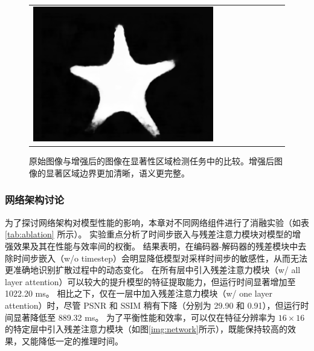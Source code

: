 \begin{figure}[ht]
\begin{center}
\begin{tabular}{ccccccccc}
            \includegraphics[width = 0.10\linewidth, height=0.10\linewidth]{figures/ch3/compare/discussion/SOD/sod/9.png}  \\
		\end{tabular}
	\end{center}
	\caption{\label{img:sod}原始图像与增强后的图像在显著性区域检测任务中的比较。增强后图像的显著区域边界更加清晰，语义更完整。}
	\vspace{-2mm}
\end{figure}     %

\subsubsection{网络架构讨论}
为了探讨网络架构对模型性能的影响，本章对不同网络组件进行了消融实验（如表 \ref{tab:ablation} 所示）。
实验重点分析了时间步嵌入与残差注意力模块对模型的增强效果及其在性能与效率间的权衡。
结果表明，在编码器-解码器的残差模块中去除时间步嵌入（w/o timestep）会明显降低模型对采样时间步的敏感性，从而无法更准确地识别扩散过程中的动态变化。
在所有层中引入残差注意力模块（w/ all layer attention）可以较大的提升模型的特征提取能力，但运行时间显著增加至 1022.20 ms。
相比之下，仅在一层中加入残差注意力模块（w/ one layer attention）时，尽管 PSNR 和 SSIM 稍有下降（分别为 29.90 和 0.91），但运行时间显著降低至 889.32 ms。
为了平衡性能和效率，可以仅在特征分辨率为 $16 \times 16$ 的特定层中引入残差注意力模块（如图\ref{img:network}所示），既能保持较高的效果，又能降低一定的推理时间。
\begin{table}[ht]
    \vspace{-0.4mm}
    \centering
    \caption{\label{tab:ablation}消融实验结果}
    \vspace{1mm}
\end{table}

